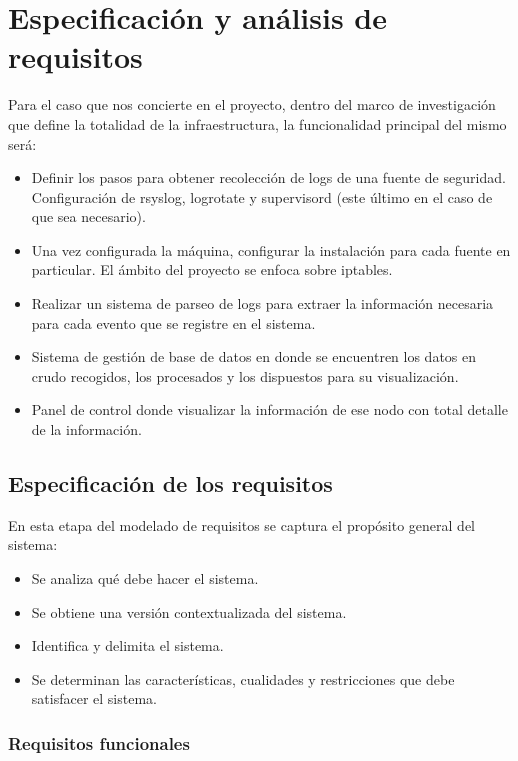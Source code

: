 \chapter[Requisitos]{Especificación y análisis de requisitos}
\label{chap:requisitos}

Para el caso que nos concierte en el proyecto, dentro del marco de investigación que define la totalidad de la infraestructura, la funcionalidad principal del mismo será:

\begin{itemize}
\item Definir los pasos para obtener recolección de logs de una fuente de seguridad. Configuración de rsyslog, logrotate y supervisord (este último en el caso de que sea necesario).
\item Una vez configurada la máquina, configurar la instalación para cada fuente en particular. El ámbito del proyecto se enfoca sobre iptables.
\item Realizar un sistema de parseo de logs para extraer la información necesaria para cada evento que se registre en el sistema.
\item Sistema de gestión de base de datos en donde se encuentren los datos en crudo recogidos, los procesados y los dispuestos para su visualización.
\item Panel de control donde visualizar la información de ese nodo con total detalle de la información.
\end{itemize}

\section[Especificación]{Especificación de los requisitos}

En esta etapa del modelado de requisitos se captura el propósito general del sistema:

\begin{itemize}
\item Se analiza qué debe hacer el sistema.
\item Se obtiene una versión contextualizada del sistema.
\item Identifica y delimita el sistema.
\item Se determinan las características, cualidades y restricciones que debe satisfacer el sistema.
\end{itemize}

\subsection{Requisitos funcionales}

